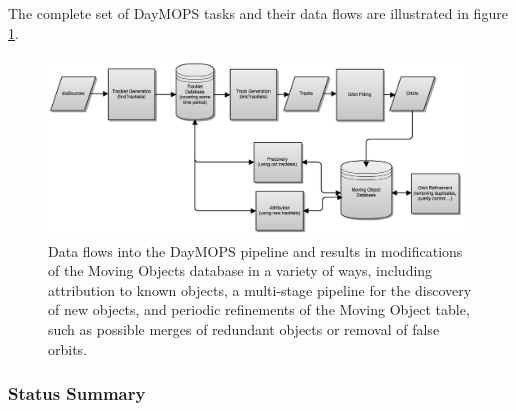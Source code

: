 The complete set of DayMOPS tasks and their data
flows are illustrated in figure \ref{mopsDiagram}.


\begin{figure}[h]
\begin{center}
  \includegraphics[width=11cm]{illustrations/MOPSDiagram.png}
\end{center}
\caption[Data flow within MOPS.]{Data flows into the DayMOPS pipeline and results in
  modifications of the Moving Objects database in a variety of ways,
  including attribution to known objects, a multi-stage pipeline for
  the discovery of new objects, and periodic refinements of the Moving
  Object table, such as possible merges of redundant objects or
  removal of false orbits. }
\label{mopsDiagram}
\end{figure}


\subsubsection{Status Summary}

